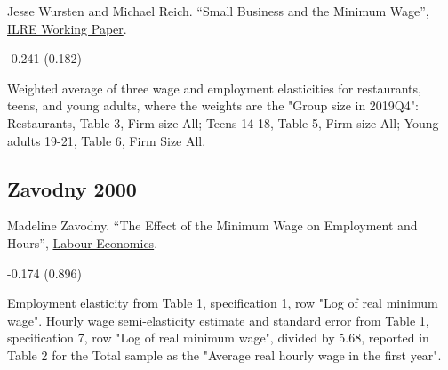 \noindent Jesse Wursten and Michael Reich. ``Small Business and the Minimum Wage'', \href{https://irle.berkeley.edu/wp-content/uploads/2023/03/Small-Businesses-and-the-Minimum-Wage-3-14-23.pdf}{ILRE Working Paper}.

\vspace{0.7em}

 -0.241 (0.182)

\vspace{0.7em}

 Weighted average of three wage and employment elasticities for restaurants, teens, and young adults, where the weights are the "Group size in 2019Q4": Restaurants, Table 3, Firm size All; Teens 14-18, Table 5, Firm size All; Young adults 19-21, Table 6, Firm Size All.

\subsection*{Zavodny 2000}
\vspace{-0.7em}

\noindent Madeline Zavodny. ``The Effect of the Minimum Wage on Employment and Hours'', \href{https://doi.org/10.1016/S0927-5371(00)00021-X}{Labour Economics}.

\vspace{0.7em}

 -0.174 (0.896)

\vspace{0.7em}

 Employment elasticity from Table 1, specification 1, row "Log of real minimum wage". Hourly wage semi-elasticity estimate and standard error from Table 1, specification 7, row "Log of real minimum wage", divided by 5.68, reported in Table 2 for the Total sample as the "Average real hourly wage in the first year".

